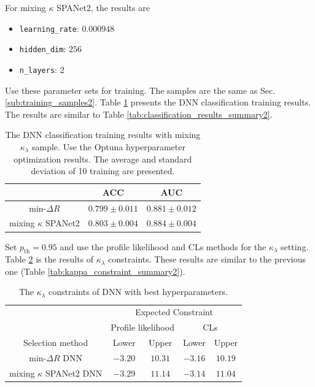\documentclass[12pt]{article}
\begin{document}
		For mixing $\kappa$ SPANet2, the results are
		\begin{itemize}
			\item \verb+learning_rate+: $0.000948$ 
			\item \verb+hidden_dim+: $256$ 
			\item \verb+n_layers+: $2$ 
		\end{itemize}

		Use these parameter sets for training. The samples are the same as Sec. \ref{sub:training_samples2}. Table \ref{tab:DNN_best_hp_cls_results} presents the DNN classification training results. The results are similar to Table \ref{tab:classification_results_summary2}.
		\begin{table}[htpb]
			\centering
			\caption{The DNN classification training results with mixing $\kappa_\lambda$ sample. Use the Optuna hyperparameter optimization results. The average and standard deviation of 10 training are presented.}
			\label{tab:DNN_best_hp_cls_results}
			\begin{tabular}{c|cc}
				& ACC     & AUC   \\ \hline
				$\text{min-}\Delta R$   & $0.799 \pm 0.011$ & $0.881 \pm 0.012$ \\
				mixing $\kappa$ SPANet2 & $0.803 \pm 0.004$ & $0.884 \pm 0.004$
			\end{tabular}      
		\end{table}

		Set $p_\text{th} = 0.95$ and use the profile likelihood and CLs methods for the $\kappa_\lambda$ setting. Table \ref{tab:kappa_constraint_DNN_best_hp} is the results of $\kappa_\lambda$ constraints. These results are similar to the previous one (Table \ref{tab:kappa_constraint_summary2}).
		\begin{table}[htpb]
			\centering
			\caption{The $\kappa_\lambda$ constraints of DNN with best hyperparameters.}
			\label{tab:kappa_constraint_DNN_best_hp}
			\begin{tabular}{c|cc|cc}
								  & \multicolumn{4}{c}{Expected Constraint}                          \\
								  & \multicolumn{2}{c}{Profile likelihood} & \multicolumn{2}{c}{CLs} \\ \hline
			Selection method      & Lower              & Upper             & Lower      & Upper      \\ \hline
			$\text{min-}\Delta R$ DNN   & $-3.20$            & $10.31$            & $-3.16$      & $10.19$      \\
			mixing $\kappa$ SPANet2 DNN & $-3.29$            & $11.14$            & $-3.14$      & $11.04$      \\
			\end{tabular}
		\end{table}
\end{document}
